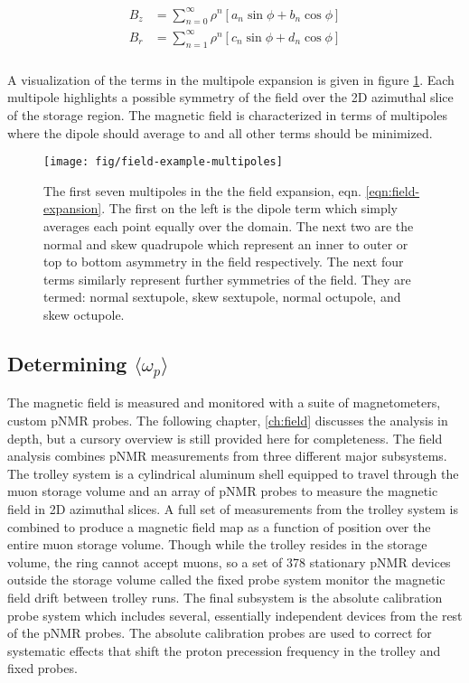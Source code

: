 \begin{align}
\label{eqn:field-expansion}
\begin{split}
B_z & = \sum_{n=0}^{\infty} \rho^n[a_n \sin{\phi} + b_n \cos{\phi}] \\
B_r & = \sum_{n=1}^{\infty} \rho^n[c_n \sin{\phi} + d_n \cos{\phi}] \\
\end{split}
\end{align}

\noindent
A visualization of the terms in the multipole expansion is given in figure \ref{fig:field-example-multipoles}.  Each multipole highlights a possible symmetry of the field over the 2D azimuthal slice of the storage region. The magnetic field is characterized in terms of multipoles where the dipole should average to \bmagic and all other terms should be minimized.

\begin{figure}
\texttt{[image: fig/field-example-multipoles]}
\caption{The first seven multipoles in the the field expansion, eqn. \ref{eqn:field-expansion}.  The first on the left is the dipole term which simply averages each point equally over the domain.  The next two are the normal and skew quadrupole which represent an inner to outer or top to bottom asymmetry in the field respectively.  The next four terms similarly represent further symmetries of the field.  They are termed: normal sextupole, skew sextupole, normal octupole, and skew octupole. \label{fig:field-example-multipoles}}
\end{figure}

\subsection{Determining $\langle \omega_p \rangle$}

The magnetic field is measured and monitored with a suite of magnetometers, custom pNMR probes. The following chapter, \ref{ch:field} discusses the analysis in depth, but a cursory overview is still provided here for completeness.  The field analysis combines pNMR measurements from three different major subsystems.  The trolley system is a cylindrical aluminum shell equipped to travel through the muon storage volume and an array of pNMR probes to measure the magnetic field in 2D azimuthal slices.  A full set of measurements from the trolley system is combined to produce a magnetic field map as a function of position over the entire muon storage volume.  Though while the trolley resides in the storage volume, the ring cannot accept muons, so a set of 378 stationary pNMR devices outside the storage volume called the fixed probe system monitor the magnetic field drift between trolley runs.  The final subsystem is the absolute calibration probe system which includes several, essentially independent devices from the rest of the pNMR probes.  The absolute calibration probes are used to correct for systematic effects that shift the proton precession frequency in the trolley and fixed probes.

